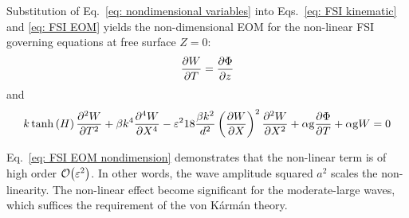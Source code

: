 Substitution of Eq.~\eqref{eq: nondimensional variables} into Eqs.~\eqref{eq: FSI kinematic} and \eqref{eq: FSI EOM} yields the non-dimensional EOM for the non-linear FSI governing equations at free surface \ensuremath{Z=0}:
\begin{equation}
    \pdv{W}{T} = \pdv{\Phi}{z}
    \label{eq: FSI kinematic nondimension}
\end{equation}
and
\begin{equation}
    k \tanh\left(H\right) \pdv[2]{W}{T}
    + \beta k^4 \pdv[4]{W}{X}
    - \varepsilon^2 18 \frac{ \beta k^2 }{ d^2 } \left( \pdv{W}{X} \right)^2 \pdv[2]{W}{X} 
    + \alpha \mathrm{g} \pdv{\Phi}{T} 
    + \alpha \mathrm{g} W
    = 0
    \label{eq: FSI EOM nondimension}
\end{equation}

Eq.~\eqref{eq: FSI EOM nondimension} demonstrates that the non-linear term is of high order \ensuremath{\order{\varepsilon^2}}. In other words, the wave amplitude squared \ensuremath{a^2} scales the non-linearity. The non-linear effect become significant for the moderate-large waves, which suffices the requirement of the von K\'{a}rm\'{a}n theory. 


